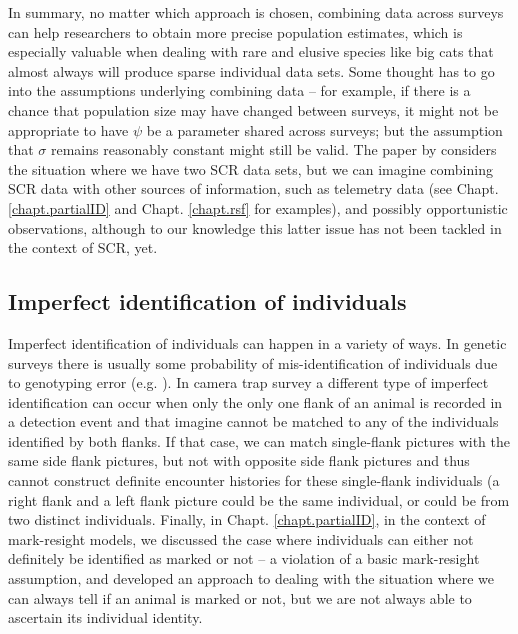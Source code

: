 In summary, no matter which approach is chosen, combining data across
surveys can help researchers to obtain more precise population
estimates, which is especially valuable when dealing with rare and
elusive species like big cats that almost always will produce sparse
individual data sets. Some thought has to go into the assumptions
underlying combining data -- for example, if there is a chance that
population size may have changed between surveys, it might not be
appropriate to have $\psi$ be a parameter shared across surveys; but
the assumption that $\sigma$ remains reasonably constant might still
be valid. The paper by \citet{gopalaswamy_etal:2012mee} considers the
situation where we have two SCR data sets, but we can imagine
combining SCR data with other sources of information, such as
telemetry data (see Chapt. \ref{chapt.partialID} and
Chapt. \ref{chapt.rsf} for examples), and possibly opportunistic
observations, although to our knowledge this latter issue has not been
tackled in the context of SCR, yet.


\subsection{Imperfect identification of individuals}

Imperfect identification of individuals can happen in a variety of
ways. In genetic surveys there is usually some probability of
mis-identification of individuals due to genotyping error
(e.g. \citet{lukacs_burnham:2005}). In camera trap survey a different
type of imperfect identification can occur when only the only one
flank of an animal is recorded in a detection event and that imagine
cannot be matched to any of the individuals identified by both
flanks. If that case, we can match single-flank pictures with the same
side flank pictures, but not with opposite side flank pictures and
thus cannot construct definite encounter histories for these
single-flank individuals (a right flank and a left flank picture could
be the same individual, or could be from two distinct
individuals. Finally, in Chapt. \ref{chapt.partialID}, in the context
of mark-resight models, we discussed the case where individuals can
either not definitely be identified as marked or not -- a violation of
a basic mark-resight assumption, and developed an approach to dealing
with the situation where we can always tell if an animal is marked or
not, but we are not always able to ascertain its individual identity.

